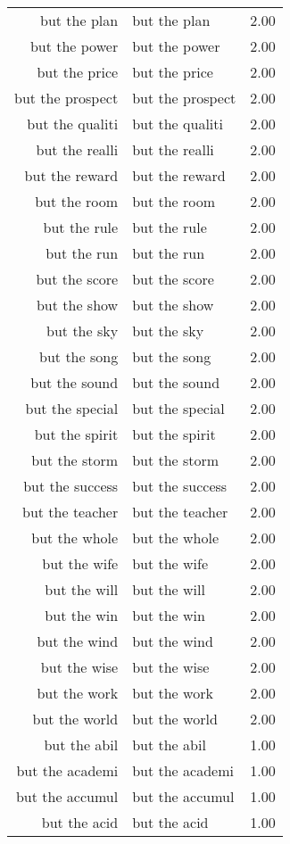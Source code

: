 \begin{table}[ht]
\begin{tabular}{rlr}
  but the plan & but the plan & 2.00 \\ 
  but the power & but the power & 2.00 \\ 
  but the price & but the price & 2.00 \\ 
  but the prospect & but the prospect & 2.00 \\ 
  but the qualiti & but the qualiti & 2.00 \\ 
  but the realli & but the realli & 2.00 \\ 
  but the reward & but the reward & 2.00 \\ 
  but the room & but the room & 2.00 \\ 
  but the rule & but the rule & 2.00 \\ 
  but the run & but the run & 2.00 \\ 
  but the score & but the score & 2.00 \\ 
  but the show & but the show & 2.00 \\ 
  but the sky & but the sky & 2.00 \\ 
  but the song & but the song & 2.00 \\ 
  but the sound & but the sound & 2.00 \\ 
  but the special & but the special & 2.00 \\ 
  but the spirit & but the spirit & 2.00 \\ 
  but the storm & but the storm & 2.00 \\ 
  but the success & but the success & 2.00 \\ 
  but the teacher & but the teacher & 2.00 \\ 
  but the whole & but the whole & 2.00 \\ 
  but the wife & but the wife & 2.00 \\ 
  but the will & but the will & 2.00 \\ 
  but the win & but the win & 2.00 \\ 
  but the wind & but the wind & 2.00 \\ 
  but the wise & but the wise & 2.00 \\ 
  but the work & but the work & 2.00 \\ 
  but the world & but the world & 2.00 \\ 
  but the abil & but the abil & 1.00 \\ 
  but the academi & but the academi & 1.00 \\ 
  but the accumul & but the accumul & 1.00 \\ 
  but the acid & but the acid & 1.00 \\ 

\end{tabular}
\end{table}
